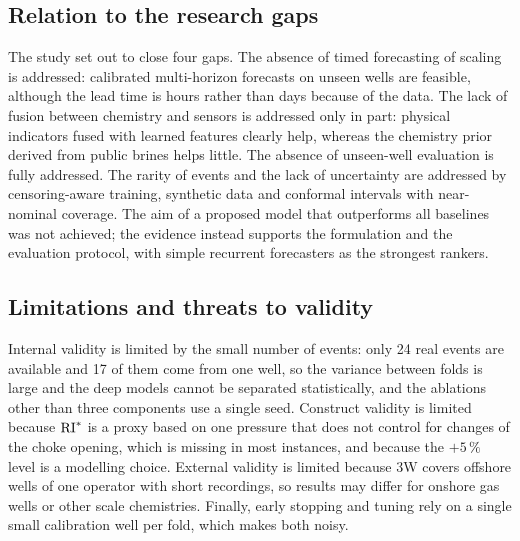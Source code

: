 \subsection{Relation to the research gaps}

The study set out to close four gaps. The absence of timed forecasting of scaling is addressed: calibrated
multi-horizon forecasts on unseen wells are feasible, although the lead time is hours rather than days
because of the data. The lack of fusion between chemistry and sensors is addressed only in part: physical
indicators fused with learned features clearly help, whereas the chemistry prior derived from public brines
helps little. The absence of unseen-well evaluation is fully addressed. The rarity of events and the lack of
uncertainty are addressed by censoring-aware training, synthetic data and conformal intervals with
near-nominal coverage. The aim of a proposed model that outperforms all baselines was not achieved; the
evidence instead supports the formulation and the evaluation protocol, with simple recurrent forecasters as
the strongest rankers.

\subsection{Limitations and threats to validity}

Internal validity is limited by the small number of events: only 24 real events are available and 17 of
them come from one well, so the variance between folds is large and the deep models cannot be separated
statistically, and the ablations other than three components use a single seed. Construct validity is
limited because $\mathrm{RI}^{*}$ is a proxy based on one pressure that does not control for changes of the choke
opening, which is missing in most instances, and because the $+5\,\%$ level is a modelling choice. External
validity is limited because 3W covers offshore wells of one operator with short recordings, so results may
differ for onshore gas wells or other scale chemistries. Finally, early stopping and tuning rely on a single
small calibration well per fold, which makes both noisy.
